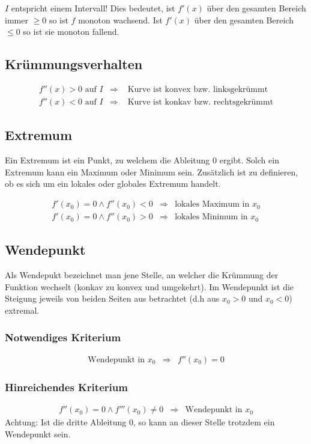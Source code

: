 \noindent
$I$ entspricht einem Intervall! Dies bedeutet, ist $f'(x)$ über den gesamten 
Bereich immer $\geq 0$ so ist $f$ monoton wachsend. Ist $f'(x)$ über den 
gesamten Bereich $\leq 0$ so ist sie monoton fallend.

\subsection{Krümmungsverhalten}

\[ \boxed{ \begin{array}{lll}
f''(x) > 0 \text{ auf } I & \Rightarrow  
& \text{ Kurve ist konvex bzw. linksgekrümmt} \\
f''(x) < 0 \text{ auf } I & \Rightarrow  
& \text{ Kurve ist konkav bzw. rechtsgekrümmt}
\end{array} } \]

\subsection{Extremum}
Ein Extremum ist ein Punkt, zu welchem die Ableitung $0$ ergibt.
Solch ein Extremum kann ein Maximum oder Minimum sein.
Zusätzlich ist zu definieren, ob es sich um ein lokales oder globales Extremum 
handelt.

\[ \boxed{ \begin{array}{lll}
f'(x_0) = 0 \land f''(x_0) < 0 & \Rightarrow & \text{lokales Maximum in $x_0$}\\
f'(x_0) = 0 \land f''(x_0) > 0 & \Rightarrow & \text{lokales Minimum in $x_0$} 
\end{array} } \]

\subsection{Wendepunkt}
Als Wendepukt bezeichnet man jene Stelle, an welcher die Krümmung der Funktion 
wechselt (konkav zu konvex und umgekehrt).
Im Wendepunkt ist die Steigung jeweils von beiden Seiten aus betrachtet 
(d.h aus $x_0 > 0$ und $x_0<0$) extremal.

\subsubsection{Notwendiges Kriterium}
\[ \boxed{ \begin{matrix}
\text{Wendepunkt in $x_0$} & \Rightarrow & f''(x_0) = 0
\end{matrix} } \]

\subsubsection{Hinreichendes Kriterium}
\[ \boxed{ \begin{matrix}
f''(x_0) = 0 \land f'''(x_0) \neq 0 & \Rightarrow & \text{Wendepunkt in $x_0$}
\end{matrix} } \]
Achtung: Ist die dritte Ableitung 0, so kann an dieser Stelle trotzdem ein 
Wendepunkt sein. 

